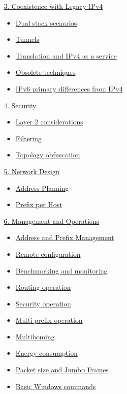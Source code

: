 \documentclass[
]{article}
\providecommand{\tightlist}{%
  \setlength{\itemsep}{0pt}\setlength{\parskip}{0pt}}
\begin{document}
\hyperref[coexistence-with-legacy-ipv4]{3. Coexistence with Legacy IPv4}

\begin{itemize}
\tightlist
\item
  \hyperref[dual-stack-scenarios]{Dual stack scenarios}
\item
  \hyperref[tunnels]{Tunnels}
\item
  \hyperref[translation-and-ipv4-as-a-service]{Translation and IPv4 as a
  service}
\item
  \hyperref[obsolete-techniques]{Obsolete techniques}
\item
  \hyperref[ipv6-primary-differences-from-ipv4]{IPv6 primary differences
  from IPv4}
\end{itemize}

\hyperref[security]{4. Security}

\begin{itemize}
\tightlist
\item
  \hyperref[layer-2-considerations]{Layer 2 considerations}
\item
  \hyperref[filtering]{Filtering}
\item
  \hyperref[topology-obfuscation]{Topology obfuscation}
\end{itemize}

\hyperref[network-design]{5. Network Design}

\begin{itemize}
\tightlist
\item
  \hyperref[address-planning]{Address Planning}
\item
  \hyperref[prefix-per-host]{Prefix per Host}
\end{itemize}

\hyperref[management-and-operations]{6. Management and Operations}

\begin{itemize}
\tightlist
\item
  \hyperref[address-and-prefix-management]{Address and Prefix
  Management}
\item
  \hyperref[remote-configuration]{Remote configuration}
\item
  \hyperref[benchmarking-and-monitoring]{Benchmarking and monitoring}
\item
  \hyperref[routing-operation]{Routing operation}
\item
  \hyperref[security-operation]{Security operation}
\item
  \hyperref[multi-prefix-operation]{Multi-prefix operation}
\item
  \hyperref[multihoming]{Multihoming}
\item
  \hyperref[energy-consumption]{Energy consumption}
\item
  \hyperref[packet-size-and-jumbo-frames]{Packet size and Jumbo Frames}
\item
  \hyperref[basic-windows-commands]{Basic Windows commands}
\end{itemize}
\end{document}
